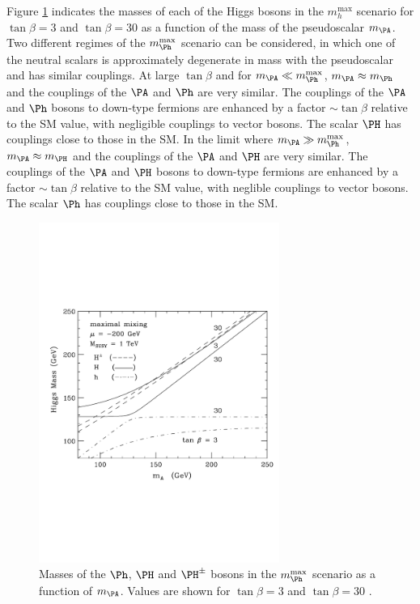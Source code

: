 Figure \ref{fig:mhmaxmasses} indicates the
masses of each of the Higgs bosons in the $m_{h}^{\text{max}}$ scenario
for $\tan\beta=3$ and $\tan\beta=30$ as a function of the mass of the
pseudoscalar $m_{\PA}$. Two different regimes of the $m_{\Ph}^{\text{max}}$
scenario can be considered, in which one of the neutral scalars is approximately
degenerate in mass with the pseudoscalar and has similar couplings. 
At large $\tan\beta$ and for $m_{\PA} \ll m_{\Ph}^{\text{max}}$, $m_{\PA}
\approx m_{\Ph}$ and the couplings of the $\PA$ and $\Ph$ are very similar. The
couplings of the $\PA$ and $\Ph$ bosons to down-type fermions 
are enhanced by a factor $\sim \tan\beta$ relative to the \ac{SM} value, with
negligible couplings to vector bosons. The scalar $\PH$ has couplings
close to those in the \ac{SM}. In the limit where $m_{\PA} \gg
m_{\Ph}^{\text{max}}$, 
$m_{\PA} \approx m_{\PH}$ and the couplings of the $\PA$ and $\PH$ are
very similar. The couplings of the $\PA$ and $\PH$ bosons to down-type fermions 
are enhanced by a factor $\sim \tan\beta$ relative to the \ac{SM} value, 
with neglible couplings to vector bosons. The scalar $\Ph$ has couplings
close to those in the \ac{SM}. 

\begin{figure}[htbp]
   \includegraphics[width=0.7\textwidth]{plots/theory/mssm_masses_mhmax.pdf}
\caption[Masses of the $\Ph$, $\PH$ and $\PH^{\pm}$ bosons in the
$m_{\Ph}^{\text{max}}$ scenario as a function of $m_{\PA}$.]{Masses of the $\Ph$, $\PH$ and $\PH^{\pm}$ bosons in the
$m_{\Ph}^{\text{max}}$ scenario as a function of $m_{\PA}$. Values are shown for
$\tan\beta=3$ and $\tan\beta=30$ \cite{Carena:2002es}.}
\label{fig:mhmaxmasses}
\end{figure}

